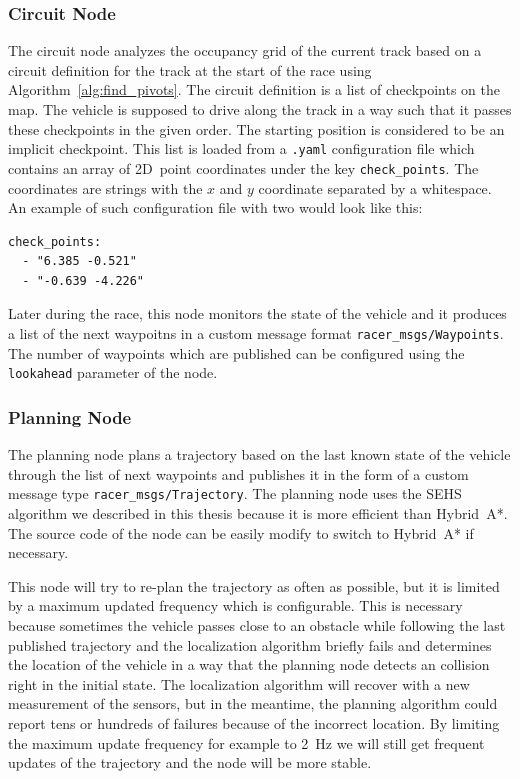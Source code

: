 \subsubsection{Circuit Node}

The circuit node analyzes the occupancy grid of the current track based on a circuit definition for the track at the start of the race using Algorithm~\ref{alg:find_pivots}. The circuit definition is a list of checkpoints on the map. The vehicle is supposed to drive along the track in a way such that it passes these checkpoints in the given order. The starting position is considered to be an implicit checkpoint. This list is loaded from a \verb|.yaml| configuration file which contains an array of 2D~point coordinates under the key \verb|check_points|. The coordinates are strings with the $x$ and $y$ coordinate separated by a whitespace. An example of such configuration file with two would look like this:

\begin{verbatim}
check_points:
  - "6.385 -0.521"
  - "-0.639 -4.226"
\end{verbatim} 

Later during the race, this node monitors the state of the vehicle and it produces a list of the next waypoitns in a custom message format
\texttt{racer\_msgs/\allowbreak Waypoints}. The number of waypoints which are published can be configured using the \texttt{lookahead} parameter of the node.

\subsubsection{Planning Node}

The planning node plans a trajectory based on the last known state of the vehicle through the list of next waypoints and publishes it in the form of a custom message type \verb|racer_msgs/Trajectory|. The planning node uses the SEHS algorithm we described in this thesis because it is more efficient than Hybrid~A*. The source code of the node can be easily modify to switch to Hybrid~A* if necessary.

This node will try to re-plan the trajectory as often as possible, but it is limited by a maximum updated frequency which is configurable. This is necessary because sometimes the vehicle passes close to an obstacle while following the last published trajectory and the localization algorithm briefly fails and determines the location of the vehicle in a way that the planning node detects an collision right in the initial state. The localization algorithm will recover with a new measurement of the sensors, but in the meantime, the planning algorithm could report tens or hundreds of failures because of the incorrect location. By limiting the maximum update frequency for example to \SI{2}{\hertz} we will still get frequent updates of the trajectory and the node will be more stable.

